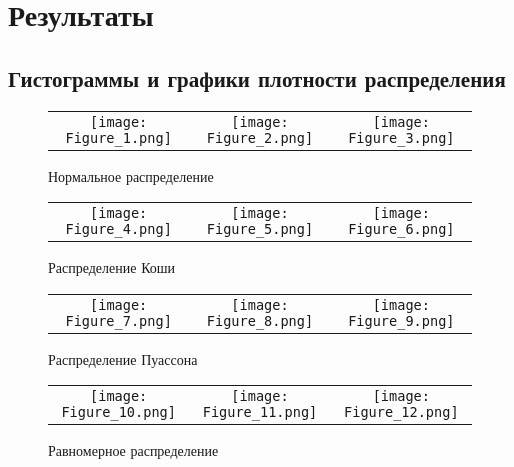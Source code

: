 \documentclass[a4paper]{article}
\begin{document}
\section {Результаты} 
\subsection{Гистограммы и графики плотности распределения}
	\begin{figure}[H]
		\centering
		\begin{tabular}{ccc}
			\texttt{[image: Figure\_1.png]}
			&
			\texttt{[image: Figure\_2.png]}
			&
			\texttt{[image: Figure\_3.png]}
		\end{tabular}
		\caption{Нормальное распределение} 
	\end{figure}
	\begin{figure}[H]
		\centering
		\begin{tabular}{ccc}
			\texttt{[image: Figure\_4.png]}
			&
			\texttt{[image: Figure\_5.png]}
			&
			\texttt{[image: Figure\_6.png]}
		\end{tabular}
		\caption{Распределение Коши}
		\label{fig:cauchy}
	\end{figure}
	\begin{figure}[H]
		\centering
		\begin{tabular}{ccc}
			\texttt{[image: Figure\_7.png]}
			&
			\texttt{[image: Figure\_8.png]}
			&
			\texttt{[image: Figure\_9.png]}
		\end{tabular}
		\caption{Распределение Пуассона}
		\label{fig:poisson}
	\end{figure}
	\begin{figure}[H]
		\centering
		\begin{tabular}{ccc}
			\texttt{[image: Figure\_10.png]}
			&
			\texttt{[image: Figure\_11.png]}
			&
			\texttt{[image: Figure\_12.png]}
		\end{tabular}
		\caption{Равномерное распределение}
		\label{fig:uniform}
	\end{figure}
\end{document}

